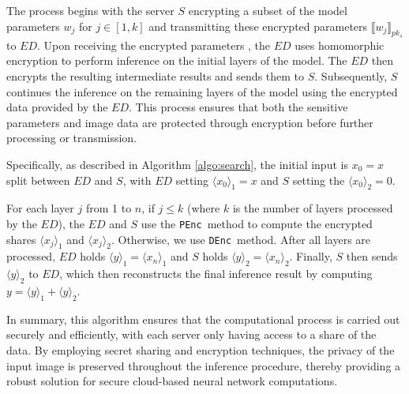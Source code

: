 \documentclass[conference]{IEEEtran}
\newcommand{\DEnc}{\texttt{DEnc}}
\newcommand{\PEnc}{\texttt{PEnc}}
\begin{document}
The process begins with the server $S$ encrypting a subset of the model parameters $w_j$ for $j \in [1,k]$ and transmitting these encrypted parameters $\llbracket w_j \rrbracket_{pk_s}$ to $ED$. Upon receiving the encrypted parameters , the $ED$ uses homomorphic encryption to perform inference on the initial layers of the model. The $ED$ then encrypts the resulting intermediate results and sends them to $S$. Subsequently, $S$ continues the inference on the remaining layers of the model using the encrypted data provided by the $ED$. This process ensures that both the sensitive parameters and image data are protected through encryption before further processing or transmission.

Specifically, as described in Algorithm \ref{algo:search}, the initial input is $x_0=x$ split between  $ED$ and $S$, with $ED$ setting $\langle x_0\rangle_1=x$ and $S$ setting the $\langle x_0\rangle_2=0$. 

For each layer $j$ from 1 to $n$, if $j \leq k$ (where $k$ is the number of layers processed by the $ED$), the $ED$ and $S$ use the \PEnc~method to compute the encrypted shares $\langle x_j \rangle_1$ and $\langle x_j \rangle_2$. Otherwise, we use \DEnc~method.
 After all layers are processed, $ED$ holds $\langle y \rangle_1=\langle x_n\rangle_1$ and $S$ holds $\langle y \rangle_2=\langle x_n\rangle_2$. Finally, $S$ then sends $\langle y \rangle_2$ to $ED$, which then reconstructs the final inference result by computing $y=\langle y \rangle_1+\langle y \rangle_2$.

In summary, this algorithm ensures that the computational process is carried out securely and efficiently, with each server only having access to a share of the data. By employing secret sharing and encryption techniques, the privacy of the input image is preserved throughout the inference procedure, thereby providing a robust solution for secure cloud-based neural network computations.


\end{document}
